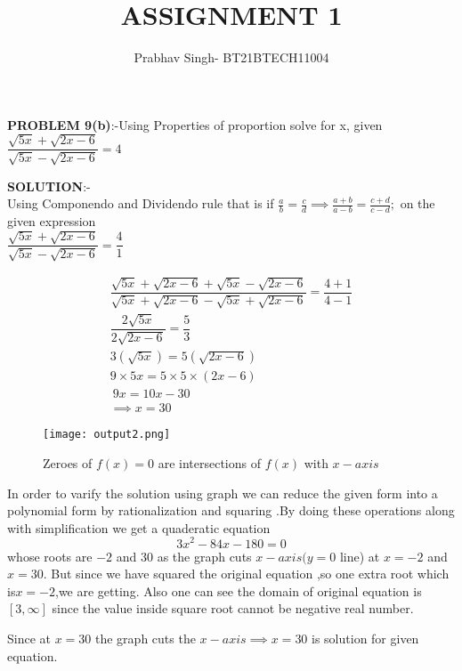 \documentclass[journal,12pt,twocolumn]{IEEEtran}
\begin{document}
	\vspace{3cm}
	\title{ASSIGNMENT 1}
	\author{Prabhav Singh- BT21BTECH11004}
	
	\maketitle
	\textbf{PROBLEM 9(b)}:-Using Properties of proportion solve for x, given\\
	
	
	\hspace*{2cm}$ 	\dfrac{\sqrt{5x}+\sqrt{2x-6}}{\sqrt{5x}-\sqrt{2x-6}} =4 $
	
	
	\medskip
	
	
	\textbf{SOLUTION}:-\\
	Using Componendo and Dividendo rule that is if $  \frac{a}{b} =\frac{c}{d} \implies \frac{a+b}{a-b} =\frac{c+d}{c-d}; $ on the given expression\\
	
	 $	\dfrac{\sqrt{5x}+\sqrt{2x-6}}{\sqrt{5x}-\sqrt{2x-6}} =\dfrac{4}{1} $
	
	\begin{align}
		\dfrac{\sqrt{5x}+\sqrt{2x-6}+\sqrt{5x}-\sqrt{2x-6}}{\sqrt{5x}+\sqrt{2x-6}-\sqrt{5x}+\sqrt{2x-6}} =\dfrac{4+1}{4-1} \\ 
		\dfrac{2\sqrt{5x}}{2\sqrt{2x-6}} =\dfrac{5}{3} \\
		3(\sqrt{5x})=5(\sqrt{2x-6}) \\
		9\times5x=5\times5\times(2x-6) \\
		\ 9x=10x-30 \\
		\implies \boxed{ x=30} 
	\end{align}
	
	\medskip
	
	\begin{figure}[h]
		\centering
		\texttt{[image: output2.png]}
		\caption{Zeroes of $ f(x) = 0 $ are intersections of $ f(x) $ with $x-axis $}
		\label{Fig1}
	\end{figure}

	In order to varify the solution using graph we can reduce the given form into a polynomial form by rationalization and squaring .By doing these operations along with simplification we get a quaderatic equation 
	\begin{equation}
		3x^{2}-84x-180=0
	\end{equation}
whose roots are $ -2 $ and $ 30 $ as the graph cuts $  x- axis(y=0  $ line) at $  x= -2 $ and $ x=30 $. But since we have squared the original equation ,so one extra root which is$  x= -2  $,we are getting. Also one can see the domain of original equation is$  [3,\infty] $ since the value inside square root cannot be negative real number. 


	Since at $ x=30 $ the graph cuts the $ x-axis \implies x=30 $ is solution for given equation.
\end{document}

